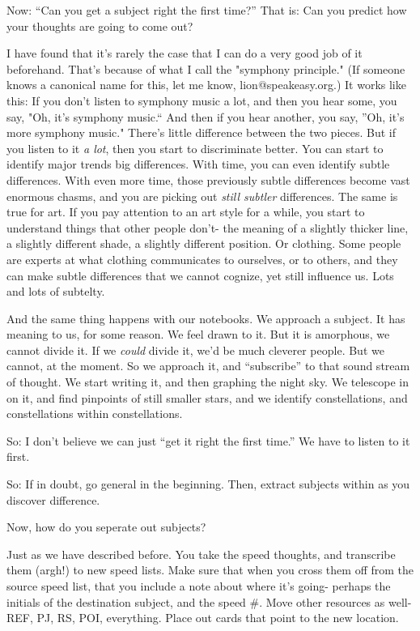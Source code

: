 \documentclass[oneside]{book}
\begin{document}
Now: ``Can you get a subject right the first time?'' That is: Can you
predict how your thoughts are going to come out?

I have found that it's rarely the case that I can do a very good job
of it beforehand. That's because of what I call the "symphony
principle." (If someone knows a canonical name for this, let me know,
lion@speakeasy.org.) It works like this: If you don't listen to
symphony music a lot, and then you hear some, you say, "Oh, it's
symphony music.`` And then if you hear another, you say, ''Oh, it's more
symphony music." There's little difference between the two pieces. But
if you listen to it \emph{a lot}, then you start to discriminate
better. You can start to identify major trends big differences. With
time, you can even identify subtle differences. With even more time,
those previously subtle differences become vast enormous chasms, and
you are picking out \emph{still subtler} differences. The same is true for
art. If you pay attention to an art style for a while, you start to
understand things that other people don't- the meaning of a slightly
thicker line, a slightly different shade, a slightly different
position. Or clothing. Some people are experts at what clothing
communicates to ourselves, or to others, and they can make subtle
differences that we cannot cognize, yet still influence us. Lots and
lots of subtelty.

And the same thing happens with our notebooks. We approach a
subject. It has meaning to us, for some reason. We feel drawn to
it. But it is amorphous, we cannot divide it. If we \emph{could} divide it,
we'd be much cleverer people. But we cannot, at the moment. So we
approach it, and ``subscribe'' to that sound stream of thought. We start
writing it, and then graphing the night sky. We telescope in on it,
and find pinpoints of still smaller stars, and we identify
constellations, and constellations within constellations.

So: I don't believe we can just ``get it right the first time.'' We have
to listen to it first.

So: If in doubt, go general in the beginning. Then, extract subjects
within as you discover difference.

Now, how do you seperate out subjects?

Just as we have described before. You take the speed thoughts, and
transcribe them (argh!) to new speed lists. Make sure that when you
cross them off from the source speed list, that you include a note
about where it's going- perhaps the initials of the destination
subject, and the speed \#. Move other resources as well- REF, PJ, RS,
POI, everything. Place out cards that point to the new location.
\end{document}
